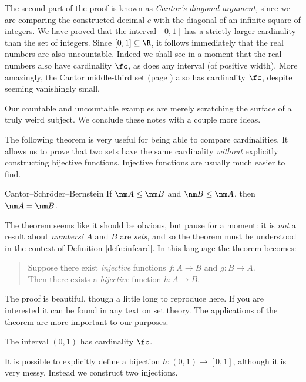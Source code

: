 The second part of the proof is known as \emph{Cantor's diagonal argument,} since we are comparing the constructed decimal $c$ with the diagonal of an infinite square of integers. We have proved that the interval $[0,1]$ has a strictly larger cardinality than the set of integers. Since $[0,1]\subseteq\R$, it follows immediately that the real numbers are also uncountable. Indeed we shall see in a moment that the real numbers also have cardinality $\fc$, as does any interval (of positive width). More amazingly, the Cantor middle-third set (page \pageref{ex:cantor}) also has cardinality $\fc$, despite seeming vanishingly small.



Our countable and uncountable examples are merely scratching the surface of a truly weird subject. We conclude these notes with a couple more ideas.\par

The following theorem is very useful for being able to compare cardinalities. It allows us to prove that two sets have the same cardinality \emph{without} explicitly constructing bijective functions. Injective functions are usually much easier to find.

\begin{thm}{Cantor--Schröder--Bernstein}{}
	If $\nm A\le\nm B$ and $\nm B\le\nm A$, then $\nm A=\nm B$.
\end{thm}

The theorem seems like it should be obvious, but pause for a moment: it is \emph{not} a result about \emph{numbers!} $A$ and $B$ are \emph{sets,} and so the theorem must be understood in the context of Definition \ref{defn:infcard}. In this language the theorem becomes:
\begin{quote}
	Suppose there exist \emph{injective} functions $f:A\to B$ and $g:B\to A$.\\
	Then there exists a \emph{bijective} function $h:A\to B$.
\end{quote}
The proof is beautiful, though a little long to reproduce here. If you are interested it can be found in any text on set theory. The applications of the theorem are more important to our purposes.

\begin{thm}{}{}
	The interval $(0,1)$ has cardinality $\fc$.
\end{thm}

It is possible to explicitly define a bijection $h:(0,1)\to[0,1]$, although it is very messy. Instead we construct two injections.

